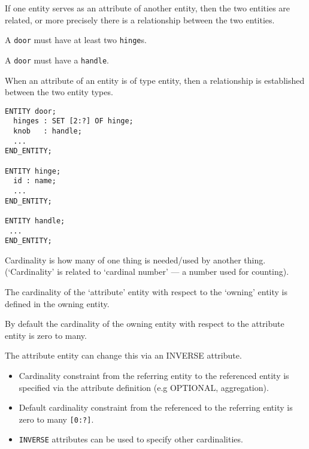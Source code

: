 \begin{remarks}
\remintro


If one entity serves as an attribute of another entity, then the two
entities are related, or more precisely there is a relationship
between the two entities.

A \texttt{door} must have at least two \texttt{hinge}s.

A \texttt{door} must have a \texttt{handle}.


\remend
\end{remarks}




    When an attribute of an entity is of type entity, then a relationship is
established between the two entity types.
\begin{verbatim}
ENTITY door;
  hinges : SET [2:?] OF hinge;
  knob   : handle;
  ...
END_ENTITY;

ENTITY hinge;
  id : name;
  ...
END_ENTITY;

ENTITY handle;
 ...
END_ENTITY;
\end{verbatim}

\begin{remarks}
\remintro



Cardinality is how many of one thing is needed/used by another thing.
(`Cardinality' is related to `cardinal number' --- a number used for 
counting).

    The cardinality of the `attribute' entity with respect to the `owning'
entity is defined in the owning entity.

    By default the cardinality of the owning entity with respect to the
attribute entity is zero to many.

    The attribute entity can change this via an INVERSE attribute.

\remend
\end{remarks}


\begin{itemize}
\item Cardinality constraint from the referring entity to the referenced
entity is specified via the attribute definition (e.g OPTIONAL, aggregation).
\item Default cardinality constraint from the referenced to the referring
entity is zero to many \verb|[0:?]|. 
\item \verb|INVERSE| attributes can be used to specify other cardinalities.
\end{itemize}

